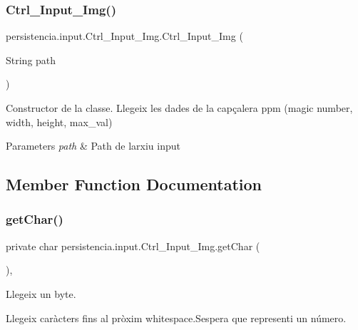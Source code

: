 \subsubsection{\texorpdfstring{Ctrl\+\_\+\+Input\+\_\+\+Img()}{Ctrl\_Input\_Img()}}
{\footnotesize\ttfamily persistencia.\+input.\+Ctrl\+\_\+\+Input\+\_\+\+Img.\+Ctrl\+\_\+\+Input\+\_\+\+Img (\begin{DoxyParamCaption}\item[{String}]{path }\end{DoxyParamCaption})\hspace{0.3cm}{\ttfamily [inline]}}



Constructor de la classe. Llegeix les dades de la capçalera ppm (magic number, width, height, max\+\_\+val) 


\begin{DoxyParams}{Parameters}
{\em path} & Path de l\textquotesingle{}arxiu input \\
\hline
\end{DoxyParams}


\subsection{Member Function Documentation}
\mbox{\label{classpersistencia_1_1input_1_1Ctrl__Input__Img_a85a204b05c118b07d403e9b59d7f18c0}} 
\subsubsection{\texorpdfstring{get\+Char()}{getChar()}}
{\footnotesize\ttfamily private char persistencia.\+input.\+Ctrl\+\_\+\+Input\+\_\+\+Img.\+get\+Char (\begin{DoxyParamCaption}{ }\end{DoxyParamCaption})\hspace{0.3cm}{\ttfamily [inline]}, {\ttfamily [private]}}



Llegeix un byte. 

Llegeix caràcters fins al pròxim whitespace.\+S\textquotesingle{}espera que representi un número.

